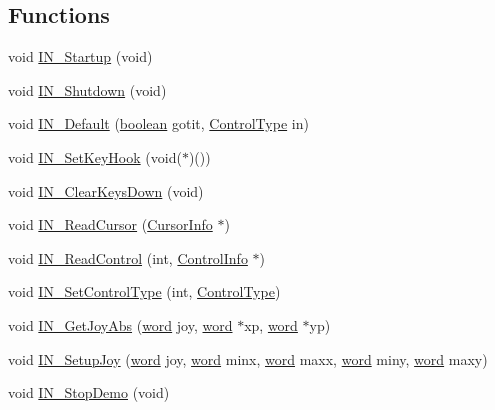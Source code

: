 \subsection*{Functions}
\begin{DoxyCompactItemize}
\item 
void \hyperlink{ID__IN_8H_a20a23654ead536c7d999b6de31a5168c}{IN\_\-Startup} (void)
\item 
void \hyperlink{ID__IN_8H_a781003199e06bab03bde6ff7051bdcbe}{IN\_\-Shutdown} (void)
\item 
void \hyperlink{ID__IN_8H_ae6921738c0736bb24d7ff5c57f3d676a}{IN\_\-Default} (\hyperlink{ID__HEAD_8H_a7c6368b321bd9acd0149b030bb8275ed}{boolean} gotit, \hyperlink{ID__IN_8H_a8005f1f182fd0248a710ca64f72508d4}{ControlType} in)
\item 
void \hyperlink{ID__IN_8H_a866bf98a85fa3cee96cb3561abad536c}{IN\_\-SetKeyHook} (void($\ast$)())
\item 
void \hyperlink{ID__IN_8H_a20251e701cb941d1b39665a9afa51f23}{IN\_\-ClearKeysDown} (void)
\item 
void \hyperlink{ID__IN_8H_a9e4c0dab67f1eff25f44424ac08368dc}{IN\_\-ReadCursor} (\hyperlink{structCursorInfo}{CursorInfo} $\ast$)
\item 
void \hyperlink{ID__IN_8H_a4ea8fe68e3dd735f35b4113ff1620569}{IN\_\-ReadControl} (int, \hyperlink{structCursorInfo}{ControlInfo} $\ast$)
\item 
void \hyperlink{ID__IN_8H_a94ada136e78d9da0c4ce6f1f70cd2ce0}{IN\_\-SetControlType} (int, \hyperlink{ID__IN_8H_a8005f1f182fd0248a710ca64f72508d4}{ControlType})
\item 
void \hyperlink{ID__IN_8H_aa9699bbe72cdd2c7a2f8d5f291ec1e76}{IN\_\-GetJoyAbs} (\hyperlink{ID__HEAD_8H_abad51e07ab6d26bec9f1f786c8d65bcd}{word} joy, \hyperlink{ID__HEAD_8H_abad51e07ab6d26bec9f1f786c8d65bcd}{word} $\ast$xp, \hyperlink{ID__HEAD_8H_abad51e07ab6d26bec9f1f786c8d65bcd}{word} $\ast$yp)
\item 
void \hyperlink{ID__IN_8H_a58e132d2bd776ef812d95ee30907cbd5}{IN\_\-SetupJoy} (\hyperlink{ID__HEAD_8H_abad51e07ab6d26bec9f1f786c8d65bcd}{word} joy, \hyperlink{ID__HEAD_8H_abad51e07ab6d26bec9f1f786c8d65bcd}{word} minx, \hyperlink{ID__HEAD_8H_abad51e07ab6d26bec9f1f786c8d65bcd}{word} maxx, \hyperlink{ID__HEAD_8H_abad51e07ab6d26bec9f1f786c8d65bcd}{word} miny, \hyperlink{ID__HEAD_8H_abad51e07ab6d26bec9f1f786c8d65bcd}{word} maxy)
\item 
void \hyperlink{ID__IN_8H_a535183b8984ee1979db6fe38a099ea7a}{IN\_\-StopDemo} (void)
\item 

\end{DoxyCompactItemize}
